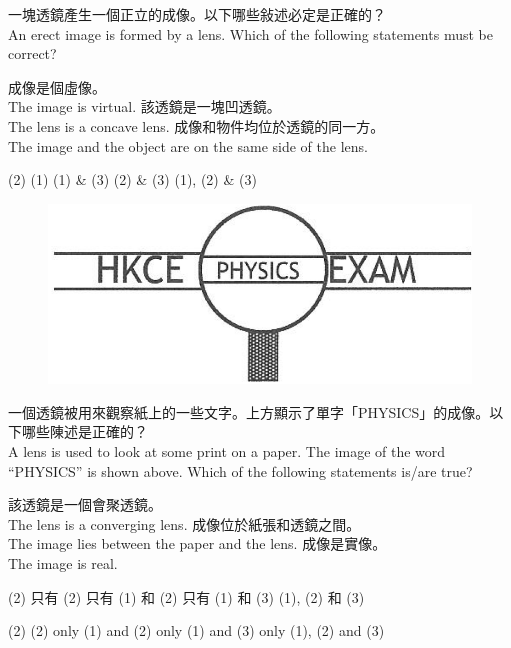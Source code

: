 \documentclass[beamer=true]{standalone}
\begin{document}
\begin{eg}
    一塊透鏡產生一個正立的成像。以下哪些敍述必定是正確的？\\An erect image is formed by a lens. Which of the following statements must be correct?
    \begin{statements}[before-skip=0pt,after-skip = 0pt]
        \task 成像是個虛像。\\The image is virtual.
        \task 該透鏡是一塊凹透鏡。\\The lens is a concave lens.
        \task 成像和物件均位於透鏡的同一方。\\The image and the object are on the same side of the lens.
    \end{statements}
    \begin{tasks}(2)
        \task (1)
        \task (1) \& (3)
        \task (2) \& (3)
        \task (1), (2) \& (3)
    \end{tasks}
\end{eg}

\begin{eg}
    \begin{figure}
        \centering
        \includegraphics[width=0.5\linewidth]{assets/x8neu983eu23.png}


    \end{figure}
    一個透鏡被用來觀察紙上的一些文字。上方顯示了單字「PHYSICS」的成像。以下哪些陳述是正確的？\\A lens is used to look at some print on a paper. The image of the word ``PHYSICS'' is shown above. Which of the following statements is/are true?

\end{eg}
\begin{eg}
    \begin{statements}[before-skip=0pt,after-skip = 0pt]
        \task 該透鏡是一個會聚透鏡。\\The lens is a converging lens.
        \task 成像位於紙張和透鏡之間。\\The image lies between the paper and the lens.
        \task 成像是實像。\\The image is real.
    \end{statements}
    \begin{tasks}(2)
        \task 只有 (2)
        \task 只有 (1) 和 (2)
        \task 只有 (1) 和 (3)
        \task (1), (2) 和 (3)
    \end{tasks}
    \begin{tasks}(2)
        \task (2) only
        \task (1) and (2) only
        \task (1) and (3) only
        \task (1), (2) and (3)
    \end{tasks}
\end{eg}
\end{document}
